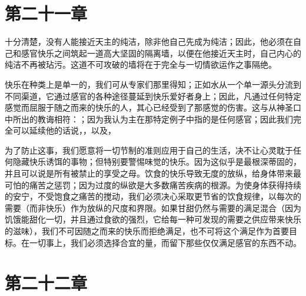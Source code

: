 
\section{第二十一章}

十分清楚，没有人能接近天主的纯洁，除非他自己先成为纯洁；因此，他必须在自己和感官快乐之间筑起一道高大坚固的隔离墙，以便在他接近天主时，自己内心的纯洁不再被玷污。这道不可攻破的墙将在于完全与一切情欲运作之事隔绝。\par

快乐在种类上是单一的，我们可从专家们那里得知；正如水从一个单一源头分流到不同渠道，它通过感官的各种途径蔓延到快乐爱好者身上；因此，凡通过任何特定感觉而屈服于随之而来的快乐的人，其心已经受到了那感觉的伤害。这与从神圣口中所出的教诲相符：；因为我认为主在那特定例子中指的是任何感官；因此我们完全可以延续他的话说，，以及，\par

为了防止这事，我们愿意将一切节制的准则应用于自己的生活，决不让心灵耽于任何隐藏快乐诱饵的事物；但特别要警惕味觉的快乐。因为这似乎是最根深蒂固的，并且可以说是所有被禁止的享受之母。饮食的快乐导致无度的放纵，给身体带来最可怕的痛苦之惩罚；因为过度的纵欲是大多数痛苦疾病的根源。为使身体获得持续的安宁，不受饱食之痛苦的搅动，我们必须决心采取更节省的饮食规律，以每次的需要（而非快乐）作为放纵的尺度和界限。如果甘甜仍然与需要的满足混合（因为饥饿能甜化一切，并且通过食欲的强烈，它给每一种可发现的需要之供应带来快乐的滋味），我们不可因随之而来的快乐而拒绝满足，也不可将这个满足作为首要目标。在一切事上，我们必须选择合宜的量，而留下那些仅仅满足感官的东西不动。\par


\section{第二十二章}

